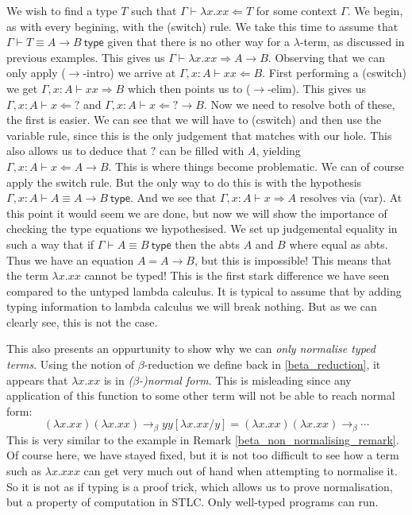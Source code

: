 \begin{example}
\begin{example}\label{mockingbird}
    We wish to find a type $T$ such that $\Gamma \vdash \lambda x . x x \Leftarrow T$ for some context $\Gamma$. We begin, as with every begining, with the (switch) rule. We take this time to assume that $\Gamma \vdash T \equiv A \to B \ \mathsf{type}$ given that there is no other way for a $\lambda$-term, as discussed in previous examples. This gives us $\Gamma \vdash \lambda x . x x \Rightarrow A \to B$. Observing that we can only apply ($\to$-intro) we arrive at $\Gamma , x : A\vdash x x \Leftarrow B$. First performing a (cswitch) we get $\Gamma , x : A\vdash x x \Rightarrow B$ which then points us to ($\to$-elim). This gives us $\Gamma , x : A \vdash x \Leftarrow \boxed{?}$ and $\Gamma , x : A \vdash x \Leftarrow \boxed{?} \to B$. Now we need to resolve both of these, the first is easier. We can see that we will have to (cswitch) and then use the variable rule, since this is the only judgement that matches with our hole. This also allows us to deduce that $\boxed{?}$ can be filled with $A$, yielding $\Gamma , x : A \vdash x \Leftarrow A \to B$. This is where things become problematic. We can of course apply the switch rule. But the only way to do this is with the hypothesis $\Gamma , x : A \vdash A \equiv A \to B \ \mathsf{type}$. And we see that $\Gamma , x : A \vdash x \Rightarrow A$ resolves via (var).
    At this point it would seem we are done, but now we will show the importance of checking the type equations we hypothesised. We set up judgemental equality in such a way that if $\Gamma \vdash A \equiv B \ \mathsf{type}$ then the abts $A$ and $B$ where equal as abts. Thus we have an equation $A = A \to B$, but this is impossible!
    This means that the term $\lambda x . x x$ cannot be typed! This is the first stark difference we have seen compared to the untyped lambda calculus. It is typical to assume that by adding typing information to lambda calculus we will break nothing. But as we can clearly see, this is not the case. 
\end{example}

\begin{remark}
    This also presents an oppurtunity to show why we can \emph{only normalise typed terms}. Using the notion of $\beta$-reduction we define back in \ref{beta_reduction}, it appears that $\lambda x . x x$ is in \emph{($\beta$-)normal form}. This is misleading since any application of this function to some other term will not be able to reach normal form:
    \begin{equation*}
        (\lambda x. x x)(\lambda x . x x) \to_{\beta} y y [\lambda x . x x / y] = (\lambda x . x x)(\lambda x . x x) \to_{\beta} \cdots
    \end{equation*}
    This is very similar to the example in Remark \ref{beta_non_normalising_remark}. Of course here, we have stayed fixed, but it is not too difficult to see how a term such as $\lambda x . x x x$ can get very much out of hand when attempting to normalise it.
    So it is not as if typing is a proof trick, which allows us to prove normalisation, but a property of computation in STLC. Only well-typed programs can run.
\end{remark}


\end{example}
